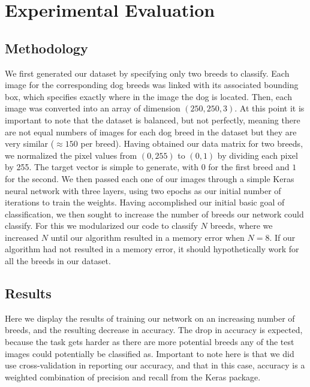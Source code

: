 \documentclass[12pt]{article}
\begin{document}
\section{Experimental Evaluation}

\subsection{Methodology}

We first generated our dataset by specifying only two breeds to classify. Each image for the corresponding dog breeds was linked with its associated bounding box, which specifies exactly where in the image the dog is located. Then, each image was converted into an array of dimension $(250,250,3)$. At this point it is important to note that the dataset is balanced, but not perfectly, meaning there are not equal numbers of images for each dog breed in the dataset but they are very similar ($\approx 150$ per breed). Having obtained our data matrix for two breeds, we normalized the pixel values from $(0,255)$ to $(0,1)$ by dividing each pixel by 255. The target vector is simple to generate, with $0$ for the first breed and $1$ for the second. We then passed each one of our images through a simple Keras neural network with three layers, using two epochs as our initial number of iterations to train the weights. Having accomplished our initial basic goal of classification, we then sought to increase the number of breeds our network could classify. For this we modularized our code to classify $N$ breeds, where we increased $N$ until our algorithm resulted in a memory error when $N=8$. If our algorithm had not resulted in a memory error, it should hypothetically work for all the breeds in our dataset.

\subsection{Results}

Here we display the results of training our network on an increasing number of breeds, and the resulting decrease in accuracy. The drop in accuracy is expected, because the task gets harder as there are more potential breeds any of the test images could potentially be classified as. Important to note here is that we did use cross-validation in reporting our accuracy, and that in this case, accuracy is a weighted combination of precision and recall from the Keras package. 
\end{document}
